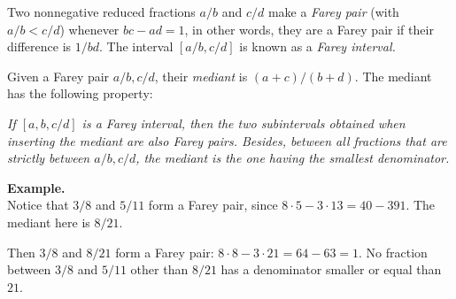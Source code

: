 \documentclass[12pt]{article}
\begin{document}
Two nonnegative reduced fractions $a/b$ and $c/d$ make a \emph{Farey pair} (with $a/b < c/d$) whenever $bc-ad=1$, in other words, they are a Farey pair if their difference is $1/bd$. The interval $[a/b, c/d]$ is known as a \emph{Farey interval.}

Given a Farey pair $a/b,c/d$, their \emph{mediant} is $(a+c)/(b+d)$. The mediant has the following property:

{\sl If $[a,b,c/d]$ is a Farey interval, then the two subintervals obtained when inserting the mediant are also Farey pairs. Besides, between all fractions that are strictly between $a/b,c/d$, the mediant is the one having the smallest denominator.}

{\bf Example.}\\
Notice that $3/8$ and $5/11$ form a Farey pair, since 
$8\cdot 5 - 3\cdot 13 =40-391$. The mediant here is $8/21$.

Then $3/8$ and $8/21$ form a Farey pair: $8\cdot 8 - 3\cdot 21 = 64-63=1$.
No fraction between $3/8$ and $5/11$ other than $8/21$ has a denominator smaller or equal than $21$.
\end{document}
